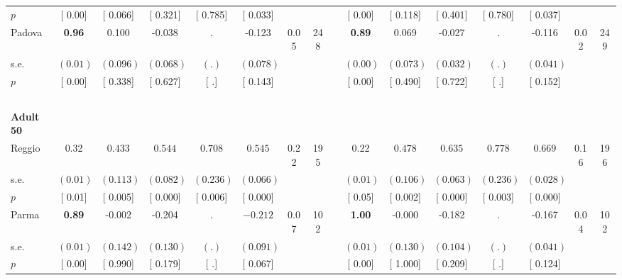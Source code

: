 \begin{longtable}{L{8em} c c c c c c c p{1em} c c c c c c c}
\quad \quad \quad \quad $ p$ & [     0.00] & [    0.066] & [    0.321] & [    0.785] & [    0.033] & & & & [     0.00] & [    0.118] & [    0.401] & [    0.780] & [    0.037] & &  \\[1em]
\quad \quad \quad Padova& \textbf{     0.96} &     0.100 &    -0.038 &         . &    -0.123 &      0.05 &       248 & & \textbf{     0.89} &     0.069 &    -0.027 &         . &    -0.116 &      0.02 &       249  \\*
\quad \quad \quad \quad s.e.& $ (     0.01)$ & $ (    0.096)$ & $ (    0.068)$ & $ (        .)$ & $ (    0.078)$ & & & & $ (     0.00)$ & $ (    0.073)$ & $ (    0.032)$ & $ (        .)$ & $ (    0.041)$ & &  \\*
\quad \quad \quad \quad $ p$ & [     0.00] & [    0.338] & [    0.627] & [        .] & [    0.143] & & & & [     0.00] & [    0.490] & [    0.722] & [        .] & [    0.152] & &  \\[1em]
~\\[1em]
\quad \quad \textbf{Adult 50} & & & & & & & & & & & & & & & \\* 
\quad \quad \quad Reggio& 0.32 & $ \mathbf{    0.433}$ & $ \mathbf{    0.544}$ & $ \mathbf{    0.708}$ & $ \mathbf{    0.545}$ &      0.22 &       195 & & 0.22 & $ \mathbf{    0.478}$ & $ \mathbf{    0.635}$ & $ \mathbf{    0.778}$ & $ \mathbf{    0.669}$ &      0.16 &       196  \\*
\quad \quad \quad \quad s.e.& $ (     0.01)$ & $ (    0.113)$ & $ (    0.082)$ & $ (    0.236)$ & $ (    0.066)$ & & & & $ (     0.01)$ & $ (    0.106)$ & $ (    0.063)$ & $ (    0.236)$ & $ (    0.028)$ & &  \\*
\quad \quad \quad \quad $ p$ & [     0.01] & [    0.005] & [    0.000] & [    0.006] & [    0.000] & & & & [     0.05] & [    0.002] & [    0.000] & [    0.003] & [    0.000] & &  \\[1em]
\quad \quad \quad Parma& \textbf{     0.89} &    -0.002 &    -0.204 &         . & $ \mathbf{   -0.212}$ &      0.07 &       102 & & \textbf{     1.00} &    -0.000 &    -0.182 &         . &    -0.167 &      0.04 &       102  \\*
\quad \quad \quad \quad s.e.& $ (     0.01)$ & $ (    0.142)$ & $ (    0.130)$ & $ (        .)$ & $ (    0.091)$ & & & & $ (     0.01)$ & $ (    0.130)$ & $ (    0.104)$ & $ (        .)$ & $ (    0.041)$ & &  \\*
\quad \quad \quad \quad $ p$ & [     0.00] & [    0.990] & [    0.179] & [        .] & [    0.067] & & & & [     0.00] & [    1.000] & [    0.209] & [        .] & [    0.124] & &  \\[1em]

\end{longtable}
